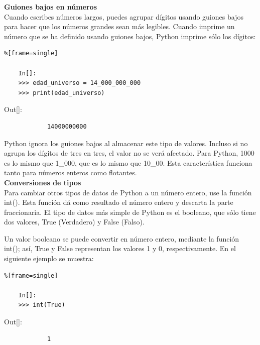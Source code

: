 {\bf {Guiones bajos en números}}\\

Cuando escribes números largos, puedes agrupar dígitos usando guiones bajos 
para hacer que los números grandes sean más legibles. Cuando imprime un número que se ha definido usando guiones bajos, Python imprime  sólo los dígitos:

\begin{lstlisting}%[frame=single]
	
	In[]:	
	>>> edad_universo = 14_000_000_000
	>>> print(edad_universo)	
\end{lstlisting}

{\ttfamily\scriptsize\scriptsize 
	\hspace{-0.65cm}Out[]:\vspace{-0.15cm}	
	{\color{blue} 	
		
		\begin{verbatim}
			14000000000
		\end{verbatim}
}}

Python ignora los guiones bajos al almacenar este tipo de valores.
Incluso si no agrupa los dígitos de tres en tres, el valor no se verá afectado.
Para Python, 1000 es lo mismo que 1\_000, que es lo mismo que 10\_00. Esta característica funciona tanto para números enteros como flotantes.\\


{\bf Conversiones de tipos}\\

Para cambiar otros tipos de datos de Python a un número entero, use la función {\ttfamily int()}. Esta función dá
como resultado el número entero y descarta la parte fraccionaria. El tipo de datos más simple de Python es el booleano, que sólo tiene dos valores, {\ttfamily True} (Verdadero) y  {\ttfamily  False} (Falso). 

Un  valor booleano se puede convertir  en número entero, mediante  la función {\ttfamily int()}; así, True  y False representan los valores 1 y 0, respectivamente.  En el siguiente ejemplo se muestra:


\begin{lstlisting}%[frame=single]
	
	In[]:
	>>> int(True)	
\end{lstlisting}

{\ttfamily\scriptsize\scriptsize 
	\hspace{-0.65cm}Out[]:\vspace{-0.15cm}	
	{\color{blue} 	
		\begin{verbatim}
			1
		\end{verbatim}
}}


